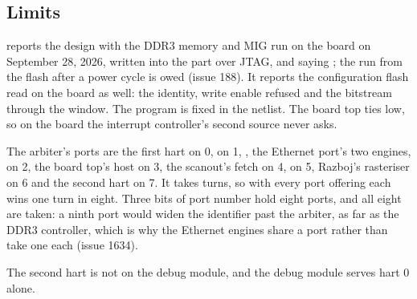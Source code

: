 \subsection*{Limits}

 reports the design with the DDR3 memory and MIG
run on the board on September 28, 2026, written into the part over
JTAG, and saying ; the run from the flash after a power
cycle is owed (issue 188). It reports the configuration flash read on
the board as well: the identity, write enable refused and the
bitstream through the window. The program is fixed in the netlist. The board top ties  low, so on the
board the interrupt controller's second source never asks.

The arbiter's ports are the first hart on 0,  on 1,
, the Ethernet port's two engines, on 2, the board top's
host on 3, the scanout's fetch on 4,  on 5, Razboj's
rasteriser on 6 and the second hart on 7. It takes turns, so with
every port offering each wins one turn in eight. Three bits of port
number hold eight ports, and all eight are taken: a ninth port would
widen the identifier past the arbiter, as far as the DDR3 controller,
which is why the Ethernet engines share a port rather than take one
each (issue 1634).

The second hart is not on the debug module, and the debug module
serves hart 0 alone.
